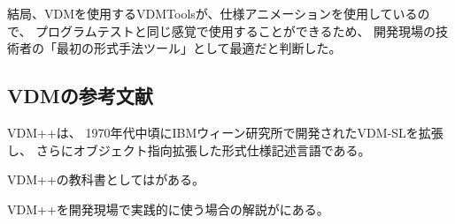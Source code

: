 結局、VDMを使用するVDMToolsが、仕様アニメーションを使用しているので、
プログラムテストと同じ感覚で使用することができるため、
開発現場の技術者の「最初の形式手法ツール」として最適だと判断した。

\subsection{VDMの参考文献}
	\label{VDMref}
VDM++\cite{SCSK2012PP}は、
1970年代中頃にIBMウィーン研究所で開発されたVDM-SL\cite{SCSK2012SL}を拡張し、
さらにオブジェクト指向拡張した形式仕様記述言語である。

VDM++の教科書としては\cite{Sakoh2010}がある。

VDM++を開発現場で実践的に使う場合の解説が\cite{Sahara2008}にある。


